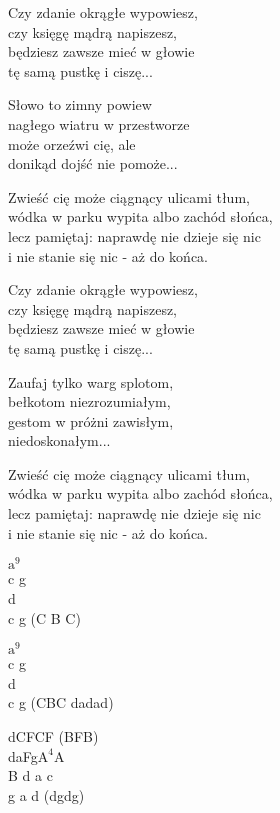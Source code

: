 \begin{textn}
    Czy zdanie okrągłe wypowiesz,\\
    czy księgę mądrą napiszesz,\\
    będziesz zawsze mieć w głowie\\
    tę samą pustkę i ciszę...

    Słowo to zimny powiew\\
    nagłego wiatru w przestworze\\
    może orzeźwi cię, ale\\
    donikąd dojść nie pomoże...

    \vin Zwieść cię może ciągnący ulicami tłum,\\
    \vin wódka w parku wypita albo zachód słońca,\\
    \vin lecz pamiętaj: naprawdę nie dzieje się nic\\
    \vin i nie stanie się nic - aż do końca.

    Czy zdanie okrągłe wypowiesz,\\
    czy księgę mądrą napiszesz,\\
    będziesz zawsze mieć w głowie\\
    tę samą pustkę i ciszę...

    Zaufaj tylko warg splotom,\\
    bełkotom niezrozumiałym,\\
    gestom w próżni zawisłym,\\
    niedoskonałym...

    Zwieść cię może ciągnący ulicami tłum,\\
    wódka w parku wypita albo zachód słońca,\\
    lecz pamiętaj: naprawdę nie dzieje się nic\\
    i nie stanie się nic - aż do końca.
\end{textn}
\begin{chordw}
    $\mathrm{a^{9}}$\\
    c g\\
    d\\
    c g (C B C)

    $\mathrm{a^{9}}$\\
    c g\\
    d\\
    c g (CBC dadad)

    dCFCF (BFB)\\
    daFg$\mathrm{A^{4}}$A\\
    B d a c\\
    g a d (dgdg)
\end{chordw}
